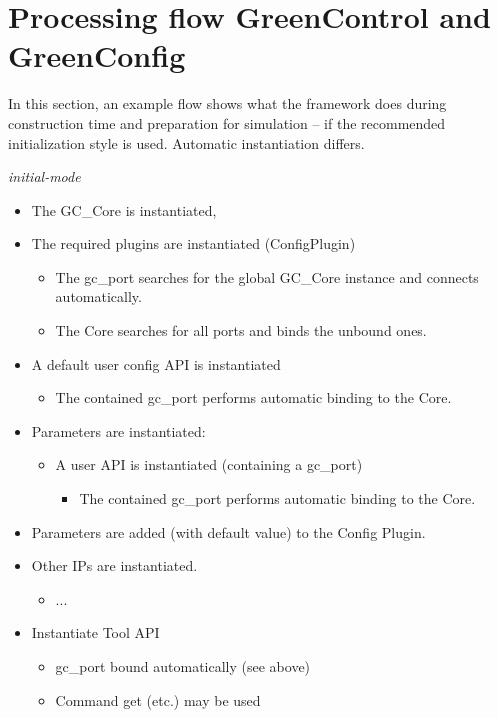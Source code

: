 \section{Processing flow GreenControl and GreenConfig}
In this section, an example flow shows what the framework does during construction time and preparation for simulation -- if the recommended initialization style is used. Automatic instantiation differs.

{\em initial-mode}

\begin{itemize}
	\item The GC\_Core is instantiated,

	\item The required plugins are instantiated (ConfigPlugin)
	\begin{itemize}
		\item The gc\_port searches for the global GC\_Core instance and connects automatically.
		\item The Core searches for all ports and binds the unbound ones.
	\end{itemize}

	\item A default user config API is instantiated
	\begin{itemize}
		\item The contained gc\_port performs automatic binding to the Core.
	\end{itemize}

	\item Parameters are instantiated:
	\begin{itemize}
		\item A user API is instantiated (containing a gc\_port)
		\begin{itemize}
			\item The contained gc\_port performs automatic binding to the Core.
		\end{itemize}
	\end{itemize}
	\item Parameters are added (with default value) to the Config Plugin.

	\item Other IPs are instantiated.
	\begin{itemize}
		\item ...
	\end{itemize}

  \item Instantiate Tool API
  \begin{itemize}
		\item gc\_port bound automatically (see above)
		\item Command get (etc.) may be used
	\end{itemize}


\end{itemize}
